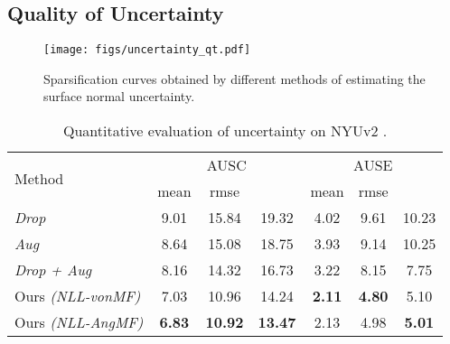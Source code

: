 \documentclass[10pt,twocolumn,letterpaper]{article}
\begin{document}
\subsection{Quality of Uncertainty}

\begin{figure}[t]
\begin{center}
\texttt{[image: figs/uncertainty\_qt.pdf]}
\end{center}
\caption{Sparsification curves obtained by different methods of estimating the surface normal uncertainty.}
\label{fig:roc}
\end{figure}

\begin{table}[t]
\setlength\tabcolsep{1.5pt}
\begin{center}
\begin{tabular}{l|ccc|ccc}
\toprule
\multirow{2}{4em}{Method} & \multicolumn{3}{c|}{\small AUSC } &
\multicolumn{3}{c}{\small AUSE }\\
\cline{2-7}
& {\small mean} & {\small rmse} & {\footnotesize }
& {\small mean} & {\small rmse} & {\footnotesize }\\
\midrule
\textit{Drop} 
& 9.01 & 15.84 & 19.32 & 4.02 & 9.61 & 10.23\\
\textit{Aug} 
& 8.64 & 15.08 & 18.75 & 3.93 & 9.14 & 10.25\\
\textit{Drop + Aug} 
& 8.16 & 14.32 & 16.73 & 3.22 & 8.15 & 7.75\\
\hline
Ours \textit{(NLL-vonMF)} 
& 7.03 & 10.96 & 14.24 & \textbf{2.11} & \textbf{4.80} & 5.10\\
Ours \textit{(NLL-AngMF)} 
& \textbf{6.83} & \textbf{10.92} & \textbf{13.47} & 2.13 & 4.98 & \textbf{5.01}\\
\bottomrule
\end{tabular}
\end{center}
\caption{Quantitative evaluation of uncertainty on NYUv2 \cite{NYUv2}.}
\label{table:uncertainty-nyu}
\end{table}
\end{document}
